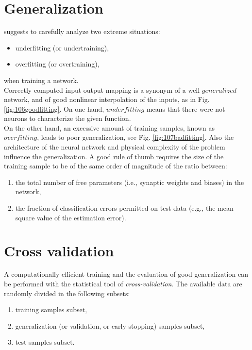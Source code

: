 \section{Generalization}
\label{sec:generalization}



\citet {RefWorks:158} suggests to carefully analyze two extreme situations:
\begin{itemize}
  \item {underfitting (or undertraining),}
  \item {overfitting (or overtraining),}
\end{itemize}
when training a network.\\
Correctly computed input-output mapping is a synonym of a well $generalized$
network, and of good nonlinear interpolation of the inputs, as in Fig. 
\ref{fig:106goodfitting}. 
On one hand, $underfitting$ means that there were not neurons to characterize
the given function.\\
On the other hand, an excessive amount of
training samples, known as $overfitting$, leads to poor generalization, see 
Fig. \ref{fig:107badfitting}. Also the architecture of the neural network and
physical complexity of the problem influence the generalization.
A good rule of thumb requires the size of the training sample to be of the same
order of magnitude of the ratio between:
\begin{enumerate}[label=(\alph*)]
  \item{the total number of free parameters (i.e., synaptic weights and biases)
  in the network,}
  \item{the fraction of classification errors permitted on test data (e.g., the
  mean square value of the estimation error).}
\end{enumerate}

\section{Cross validation}
\label{sec:crossvalidation}

A computationally efficient training and the evaluation of good generalization
can be performed with the statistical tool of \textit{cross-validation}.
The available data are randomly divided in the following subsets:

\begin{enumerate}
  \item{training samples subset,}
  \item{generalization (or validation, or early stopping) samples subset,}
  \item{test samples subset.}
\end{enumerate}

